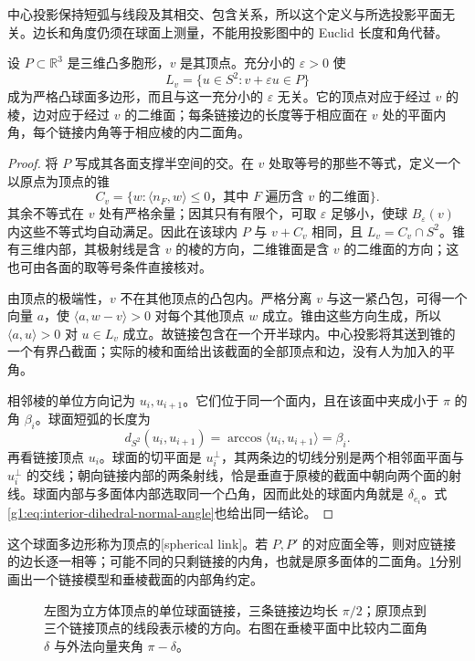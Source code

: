 中心投影保持短弧与线段及其相交、包含关系，所以这个定义与所选投影平面无关。边长和角度仍须在球面上测量，不能用投影图中的 Euclid 长度和角代替。

\begin{proposition}\label{g1:prop:vertex-spherical-link}
	设 \(P\subset\mathbb R^3\) 是三维凸多胞形，\(v\) 是其顶点。充分小的 \(\varepsilon>0\) 使
	\[
		L_v=\{u\in S^2:v+\varepsilon u\in P\}
	\]
	成为严格凸球面多边形，而且与这一充分小的 \(\varepsilon\) 无关。它的顶点对应于经过 \(v\) 的棱，边对应于经过 \(v\) 的二维面；每条链接边的长度等于相应面在 \(v\) 处的平面内角，每个链接内角等于相应棱的内二面角。
\end{proposition}
\begin{proof}
	将 \(P\) 写成其各面支撑半空间的交。在 \(v\) 处取等号的那些不等式，定义一个以原点为顶点的锥
	\[
		C_v=\{w:\langle n_F,w\rangle\le0\text{，其中 }F\text{ 遍历含 }v\text{ 的二维面}\}.
	\]
	其余不等式在 \(v\) 处有严格余量；因其只有有限个，可取 \(\varepsilon\) 足够小，使球 \(B_\varepsilon(v)\) 内这些不等式均自动满足。因此在该球内 \(P\) 与 \(v+C_v\) 相同，且 \(L_v=C_v\cap S^2\)。锥有三维内部，其极射线是含 \(v\) 的棱的方向，二维锥面是含 \(v\) 的二维面的方向；这也可由各面的取等号条件直接核对。

	由顶点的极端性，\(v\) 不在其他顶点的凸包内。严格分离 \(v\) 与这一紧凸包，可得一个向量 \(a\)，使 \(\langle a,w-v\rangle>0\) 对每个其他顶点 \(w\) 成立。锥由这些方向生成，所以 \(\langle a,u\rangle>0\) 对 \(u\in L_v\) 成立。故链接包含在一个开半球内。中心投影将其送到锥的一个有界凸截面；实际的棱和面给出该截面的全部顶点和边，没有人为加入的平角。

	相邻棱的单位方向记为 \(u_i,u_{i+1}\)。它们位于同一个面内，且在该面中夹成小于 \(\pi\) 的角 \(\beta_i\)。球面短弧的长度为
	\[
		d_{S^2}(u_i,u_{i+1})=\arccos\langle u_i,u_{i+1}\rangle=\beta_i.
	\]
	再看链接顶点 \(u_i\)。球面的切平面是 \(u_i^\perp\)，其两条边的切线分别是两个相邻面平面与 \(u_i^\perp\) 的交线；朝向链接内部的两条射线，恰是垂直于原棱的截面中朝向两个面的射线。球面内部与多面体内部选取同一个凸角，因而此处的球面内角就是 \(\delta_{e_i}\)。式\eqref{g1:eq:interior-dihedral-normal-angle}也给出同一结论。
\end{proof}

这个球面多边形称为顶点的[spherical link]。若 \(P,P'\) 的对应面全等，则对应链接的边长逐一相等；可能不同的只剩链接的内角，也就是原多面体的二面角。\cref{g1:fig:vertex-link-dihedral}分别画出一个链接模型和垂棱截面的内部角约定。

\begin{figure}[htbp]
	\centering
	
	\caption[球面链接与内二面角]{左图为立方体顶点的单位球面链接，三条链接边均长 \(\pi/2\)；原顶点到三个链接顶点的线段表示棱的方向。右图在垂棱平面中比较内二面角 \(\delta\) 与外法向量夹角 \(\pi-\delta\)。}
	\label{g1:fig:vertex-link-dihedral}
\end{figure}

